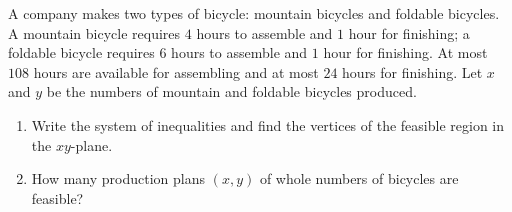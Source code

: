 A company makes two types of bicycle: mountain bicycles and foldable bicycles. A mountain bicycle requires $4$ hours to assemble and $1$ hour for finishing; a foldable bicycle requires $6$ hours to assemble and $1$ hour for finishing. At most $108$ hours are available for assembling and at most $24$ hours for finishing. Let $x$ and $y$ be the numbers of mountain and foldable bicycles produced.
\begin{enumerate}
\item[(a)] Write the system of inequalities and find the vertices of the feasible region in the $xy$-plane.
\item[(b)] How many production plans $(x,y)$ of whole numbers of bicycles are feasible?
\end{enumerate}
